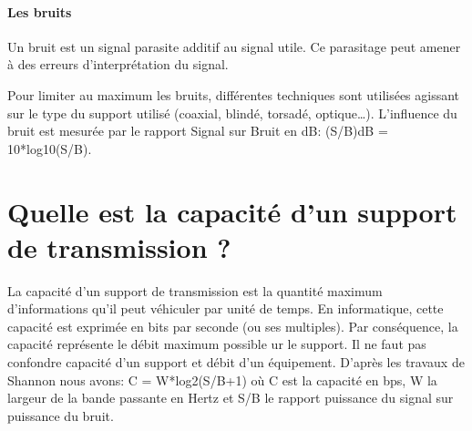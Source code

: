 \paragraph{Les bruits} Un bruit est un signal parasite additif au signal utile. Ce parasitage peut
amener à des erreurs d'interprétation du signal.

Pour limiter au maximum les bruits, différentes techniques sont utilisées agissant sur le type
du support utilisé (coaxial, blindé, torsadé, optique\ldots). L'influence du bruit est mesurée
par le rapport Signal sur Bruit en dB: (S/B)dB = 10*log10(S/B).


\section{Quelle est la capacité d'un support de transmission ?}
La capacité d'un support de transmission est la quantité maximum d'informations qu'il peut
véhiculer par unité de temps. En informatique, cette capacité est exprimée en bits par seconde
(ou ses multiples). Par conséquence, la capacité représente le débit maximum possible ur le
support. Il ne faut pas confondre capacité d'un support et débit d'un équipement. D'après les
travaux de Shannon nous avons: C = W*log2(S/B+1) où C est la capacité en bps, W la largeur de
la bande passante en Hertz et S/B le rapport puissance du signal sur puissance du bruit.



